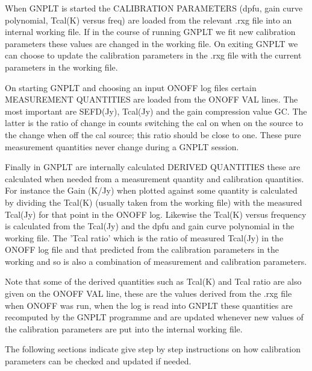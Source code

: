 \vskip 0.5cm
\vskip 0.5cm


   When GNPLT is started the CALIBRATION PARAMETERS  (dpfu, gain curve
   polynomial, Tcal(K) versus freq) are loaded from the relevant .rxg 
   file into an internal working file. If in the course of running GNPLT 
   we fit new calibration parameters these values are changed in the 
   working file. On exiting GNPLT we can choose to update the calibration
   parameters  in the .rxg file with the current parameters in the working file.
  
   On starting GNPLT and choosing an input ONOFF log files certain 
   MEASUREMENT QUANTITIES are loaded from the ONOFF VAL lines. The most
   important are SEFD(Jy), Tcal(Jy) and the gain compression value GC.
   The latter is the ratio of change in counts switching the cal on when on 
    the source to the change when off the cal source; this ratio should be 
    close to one. These pure measurement quantities never change during 
    a GNPLT session.

   Finally in GNPLT are internally calculated DERIVED QUANTITIES these
    are calculated when needed from a measurement quantity and 
    calibration quantities. For instance the Gain (K/Jy) when plotted against 
    some quantity 
    is calculated by dividing the Tcal(K) (usually taken from the working
    file) with the measured Tcal(Jy) for that point in the  ONOFF log.
     Likewise the Tcal(K) versus frequency is calculated from the
    Tcal(Jy) and the dpfu and gain curve polynomial in the working file.
    The 'Tcal ratio' which is the ratio of measured Tcal(Jy) in the ONOFF log  
    file and that predicted from the calibration parameters in the working
    and so is also a combination of measurement and calibration parameters.

    Note that some of the derived
    quantities such as  Tcal(K) and 
    Tcal ratio are also given on the ONOFF VAL line, these are the values 
    derived from the .rxg file when ONOFF was run, when the log is read 
    into GNPLT these quantities are recomputed by the GNPLT programme 
    and are updated whenever new values of the calibration parameters
    are put into the internal working file.


   The following sections indicate give step by step instructions on 
   how calibration parameters can be checked and updated if needed. 

\vskip 1cm

\vskip 0.5cm

